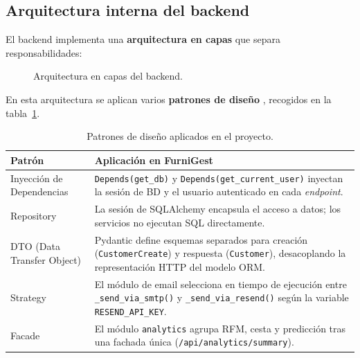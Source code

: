 \documentclass[12pt,twoside,titlepage]{report}
\begin{document}
\subsection{Arquitectura interna del backend}

El backend implementa una \textbf{arquitectura en capas} que separa responsabilidades:

\begin{figure}[H]
  \centering
  \caption{Arquitectura en capas del backend.}
  \label{fig:capas_backend}
\end{figure}

En esta arquitectura se aplican varios \textbf{patrones de diseño} \cite{fowlerRefactoring}, recogidos en la tabla~\ref{tab:patrones}.

\begin{table}[H]
  \centering
  \caption{Patrones de diseño aplicados en el proyecto.}
  \label{tab:patrones}
  \begin{tabularx}{\textwidth}{lX}
    \toprule
    \textbf{Patrón} & \textbf{Aplicación en FurniGest} \\
    \midrule
    Inyección de Dependencias & \texttt{Depends(get\_db)} y \texttt{Depends(get\_current\_user)} inyectan la sesión de BD y el usuario autenticado en cada \emph{endpoint}. \\
    Repository & La sesión de SQLAlchemy encapsula el acceso a datos; los servicios no ejecutan SQL directamente. \\
    DTO (Data Transfer Object) & Pydantic define esquemas separados para creación (\texttt{CustomerCreate}) y respuesta (\texttt{Customer}), desacoplando la representación HTTP del modelo ORM. \\
    Strategy & El módulo de email selecciona en tiempo de ejecución entre \texttt{\_send\_via\_smtp()} y \texttt{\_send\_via\_resend()} según la variable \texttt{RESEND\_API\_KEY}. \\
    Facade & El módulo \texttt{analytics} agrupa RFM, cesta y predicción tras una fachada única (\texttt{/api/analytics/summary}). \\
    \bottomrule
  \end{tabularx}
\end{table}
\end{document}
